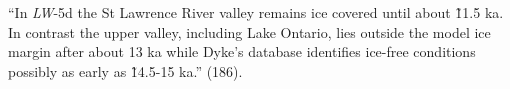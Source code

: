 ``In \emph{LW}-5d the St Lawrence River valley remains ice covered until about \~11.5 ka. In contrast the upper valley, including Lake Ontario, lies outside the model ice margin after about 13 ka while Dyke's database identifies ice-free conditions possibly as early as \~14.5-15 ka.'' \cite{Lambeck2017} (186).
